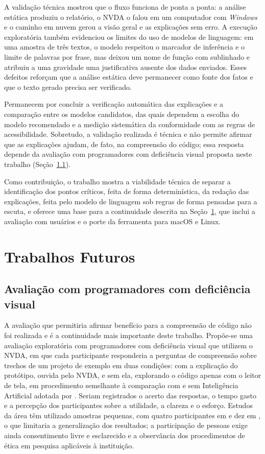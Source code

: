 \documentclass[
    12pt,                   %
    openright,              %
    oneside,                %
    a4paper,                %
    sumario=tradicional,    %
    english,                %
    brazil,                 %
    ]{abntex2}
\begin{document}
A validação técnica mostrou que o fluxo funciona de ponta a ponta: a análise estática produziu o relatório, o NVDA o falou em um computador com \textit{Windows} e o caminho em nuvem gerou a visão geral e as explicações sem erro. A execução exploratória também evidenciou os limites do uso de modelos de linguagem: em uma amostra de três textos, o modelo respeitou o marcador de inferência e o limite de palavras por frase, mas deixou um nome de função com sublinhado e atribuiu a uma gravidade uma justificativa ausente dos dados enviados. Esses defeitos reforçam que a análise estática deve permanecer como fonte dos fatos e que o texto gerado precisa ser verificado.

Permanecem por concluir a verificação automática das explicações e a comparação entre os modelos candidatos, das quais dependem a escolha do modelo recomendado e a medição sistemática da conformidade com as regras de acessibilidade. Sobretudo, a validação realizada é técnica e não permite afirmar que as explicações ajudam, de fato, na compreensão do código; essa resposta depende da avaliação com programadores com deficiência visual proposta neste trabalho (Seção~\ref{sec:usuarios}).

Como contribuição, o trabalho mostra a viabilidade técnica de separar a identificação dos pontos críticos, feita de forma determinística, da redação das explicações, feita pelo modelo de linguagem sob regras de forma pensadas para a escuta, e oferece uma base para a continuidade descrita na Seção~\ref{sec:futuros}, que inclui a avaliação com usuários e o porte da ferramenta para macOS e Linux.


\section{Trabalhos Futuros}\label{sec:futuros}

\subsection{Avaliação com programadores com deficiência visual}\label{sec:usuarios}

A avaliação que permitiria afirmar benefício para a compreensão de código não foi realizada e é a continuidade mais importante deste trabalho. Propõe-se uma avaliação exploratória com programadores com deficiência visual que utilizem o NVDA, em que cada participante responderia a perguntas de compreensão sobre trechos de um projeto de exemplo em duas condições: com a explicação do protótipo, ouvida pelo NVDA, e sem ela, explorando o código apenas com o leitor de tela, em procedimento semelhante à comparação com e sem Inteligência Artificial adotada por \textcite{latinoware34224}. Seriam registrados o acerto das respostas, o tempo gasto e a percepção dos participantes sobre a utilidade, a clareza e o esforço. Estudos da área têm utilizado amostras pequenas, com quatro participantes em \textcite{latinoware34224} e dez em \textcite{latinoware20457}, o que limitaria a generalização dos resultados; a participação de pessoas exige ainda consentimento livre e esclarecido e a observância dos procedimentos de ética em pesquisa aplicáveis à instituição.
\end{document}
